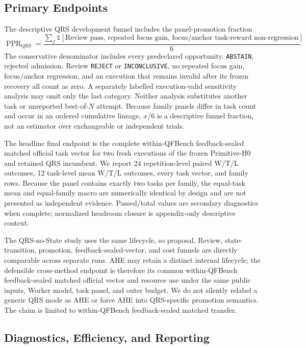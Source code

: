\subsection{Primary Endpoints}

The descriptive QRS development funnel includes the panel-promotion fraction
\begin{equation}
    \operatorname{PPR}_{\mathrm{QRS}}
    = \frac{\sum_f \mathbb{1}[\text{Review pass, repeated focus gain,
    focus/anchor task-reward non-regression}]}{6}.
\end{equation}
The conservative denominator includes every predeclared opportunity.
\texttt{ABSTAIN}, rejected admission, Review \texttt{REJECT} or
\texttt{INCONCLUSIVE}, no repeated focus gain, focus/anchor regression,
and an execution that remains invalid after its frozen recovery all count as
zero. A separately labelled execution-valid sensitivity analysis may omit only
the last category. Neither analysis substitutes another task or unreported
best-of-$N$ attempt.
Because family panels differ in task count and occur in an ordered cumulative
lineage, $x/6$ is a descriptive funnel fraction, not an estimator over
exchangeable or independent trials.

The headline final endpoint is the complete within-QFBench feedback-sealed
matched official task vector for two fresh executions of the frozen
Primitive-H0 and retained QRS incumbent. We
report 24 repetition-level paired W/T/L outcomes, 12 task-level mean W/T/L
outcomes, every task vector, and family rows. Because the panel contains exactly
two tasks per family, the equal-task mean and equal-family macro are
numerically identical by design and are not presented as independent evidence.
Passed/total values are secondary diagnostics when complete; normalized
headroom closure is appendix-only descriptive context.

The QRS-no-State study uses the same lifecycle, so proposal, Review,
state-transition, promotion, feedback-sealed-vector, and cost funnels are
directly comparable across separate runs. AHE may retain a distinct internal
lifecycle;
the defensible cross-method endpoint is therefore its common within-QFBench
feedback-sealed matched official vector and resource use under the same public
inputs, Worker model, task panel,
and outer budget. We do not silently relabel a generic QRS mode as AHE or force
AHE into QRS-specific promotion semantics. The claim is limited to
within-QFBench feedback-sealed matched transfer.

\subsection{Diagnostics, Efficiency, and Reporting}

